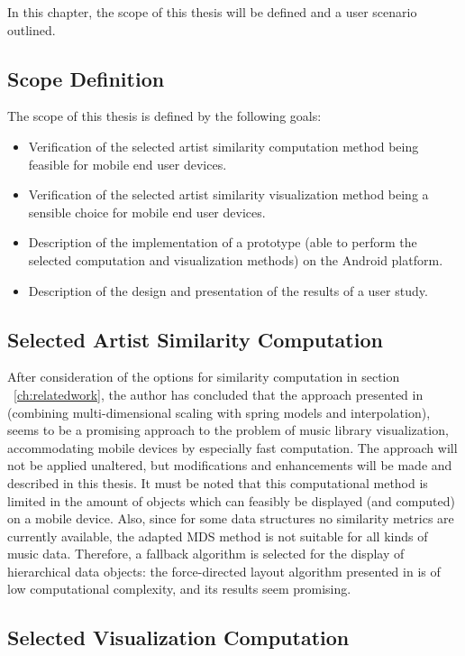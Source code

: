 In this chapter, the scope of this thesis will be defined and a user scenario outlined. 

\subsection{Scope Definition}

The scope of this thesis is defined by the following goals: 

\begin{itemize}
	\item Verification of the selected artist similarity computation method being feasible for mobile end user devices.
	\item Verification of the selected artist similarity visualization method being a sensible choice for mobile end user devices.
	\item Description of the implementation of a prototype (able to perform the selected computation and visualization methods) on the Android platform.
	\item Description of the design and presentation of the results of a user study.
\end{itemize}


\subsection{Selected Artist Similarity Computation}

After consideration of the options for similarity computation in section ~\ref{ch:relatedwork}, the author has concluded that the approach presented in \cite{Morrison:2003:FMS} (combining multi-dimensional scaling with spring models and interpolation), seems to be a promising approach to the problem of music library visualization, accommodating mobile devices by especially fast computation. The approach will not be applied unaltered, but modifications and enhancements will be made and described in this thesis. 
It must be noted that this computational method is limited in the amount of objects which can feasibly be displayed (and computed) on a mobile device. Also, since for some data structures no similarity metrics are currently available, the adapted MDS method is not suitable for all kinds of music data. Therefore, a fallback algorithm is selected for the display of hierarchical data objects: the force-directed layout algorithm presented in \cite{Kobourov04} is of low computational complexity, and its results seem promising.

\subsection{Selected Visualization Computation}

